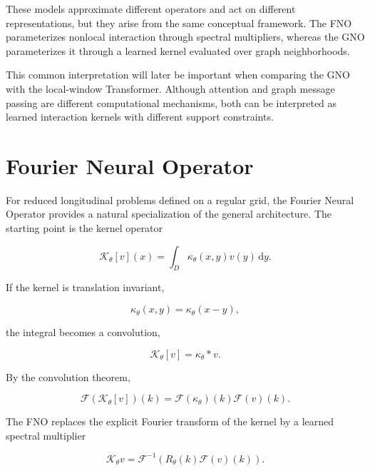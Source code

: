 These models approximate different operators and act on different representations, but they arise from the same conceptual framework. The FNO parameterizes nonlocal interaction through spectral multipliers, whereas the GNO parameterizes it through a learned kernel evaluated over graph neighborhoods.

This common interpretation will later be important when comparing the GNO with the local-window Transformer. Although attention and graph message passing are different computational mechanisms, both can be interpreted as learned interaction kernels with different support constraints.

\section{Fourier Neural Operator}
\label{sec:04_machine_learning_methodology_fourier_neural_operator}

For reduced longitudinal problems defined on a regular grid, the Fourier Neural Operator provides a natural specialization of the general architecture. The starting point is the kernel operator

\begin{equation}
\label{eq:93}
\mathcal K_{\theta}[v](x)=\int_D\kappa_{\theta}(x,y)v(y)\,\mathrm dy.
\end{equation}

If the kernel is translation invariant,

\begin{equation}
\label{eq:94}
\kappa_{\theta}(x,y)=\kappa_{\theta}(x-y),
\end{equation}

the integral becomes a convolution,

\begin{equation}
\label{eq:95}
\mathcal K_{\theta}[v]=\kappa_{\theta}*v.
\end{equation}

By the convolution theorem,

\begin{equation}
\label{eq:96}
\mathcal F(\mathcal K_{\theta}[v])(k)=\mathcal F(\kappa_{\theta})(k)\mathcal F(v)(k).
\end{equation}

The FNO replaces the explicit Fourier transform of the kernel by a learned spectral multiplier

\begin{equation}
\label{eq:97}
\mathcal K_{\theta}v=\mathcal F^{-1}(R_{\theta}(k)\mathcal F(v)(k)).
\end{equation}

